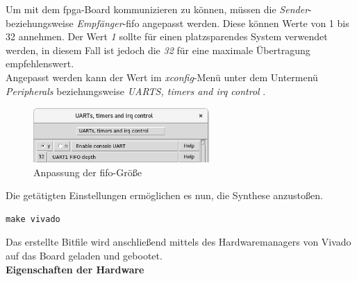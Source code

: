 Um mit dem \ac{fpga}-Board kommunizieren zu können, müssen die \emph{Sender}- beziehungsweise \emph{Empfänger}-\ac{fifo} angepasst werden. Diese können Werte von 1 bis 32 annehmen.
Der Wert \emph{1} sollte für einen platzsparendes System verwendet werden, in diesem Fall ist jedoch die \emph{32} für eine maximale Übertragung empfehlenswert.\\
Angepasst werden kann der Wert im \emph{xconfig}-Menü unter dem Untermenü \emph{Peripherals} beziehungsweise \glqq \emph{UARTS, timers and irq control} \grqq{}.\\

\begin{figure}[H]
\centering
\includegraphics[width=0.6\textwidth]{Hauptteil/fifodepth.png}
\caption{Anpassung der \ac{fifo}-Größe}
\label{fig:fifodepth}
\end{figure}




Die getätigten Einstellungen ermöglichen es nun, die Synthese anzustoßen.\\

\begin{lstlisting}[caption={Aufruf des Vivado-Programm },label={code:vivado}]
make vivado
   \end{lstlisting}






Das erstellte Bitfile wird anschließend mittels des Hardwaremanagers von Vivado auf das Board geladen und gebootet.\\



\textbf{Eigenschaften der Hardware}\\


